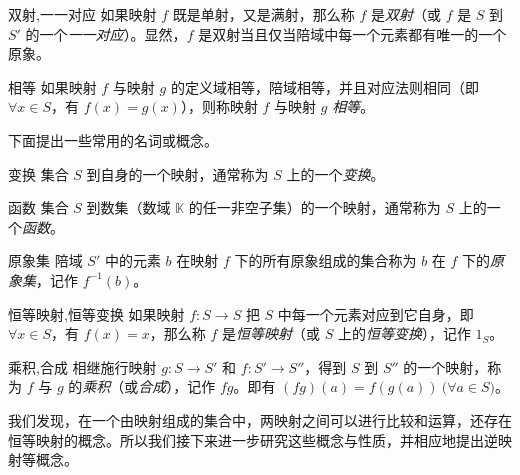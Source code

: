 \begin{definition}{双射,一一对应}
	如果映射 $f$ 既是单射，又是满射，那么称 $f$ 是\emph{双射}（或 $f$ 是 $S$ 到 $S'$ 的一个\emph{一一对应}）。显然，$f$ 是双射当且仅当陪域中每一个元素都有唯一的一个原象。
\end{definition}

\begin{definition}{相等}
	 如果映射 $f$ 与映射 $g$ 的定义域相等，陪域相等，并且对应法则相同（即 $\forall x \in S$，有 $f(x) = g(x)$），则称映射 $f$ 与映射 $g$ \emph{相等}。
\end{definition}

下面提出一些常用的名词或概念。

\begin{definition}{变换}
	集合 $S$ 到自身的一个映射，通常称为 $S$ 上的一个\emph{变换}。
\end{definition}

\begin{definition}{函数}
	集合 $S$ 到数集（数域 $\mathbb K$ 的任一非空子集）的一个映射，通常称为 $S$ 上的一个\emph{函数}。
\end{definition}

\begin{definition}{原象集}
	陪域 $S'$ 中的元素 $b$ 在映射 $f$ 下的所有原象组成的集合称为 $b$ 在 $f$ 下的\emph{原象集}，记作 $f^{-1}(b)$。
\end{definition}

\begin{definition}{恒等映射,恒等变换}
	如果映射 $f \colon S \to S$ 把 $S$ 中每一个元素对应到它自身，即 $\forall x \in S$，有 $f(x) = x$，那么称 $f$ 是\emph{恒等映射}（或 $S$ 上的\emph{恒等变换}），记作 $1_S$。
\end{definition}

\begin{definition}{乘积,合成}
	相继施行映射 $g: S \to S'$ 和 $f \colon S' \to S''$，得到 $S$ 到 $S''$ 的一个映射，称为 $f$ 与 $g$ 的\emph{乘积}（或\emph{合成}），记作 $fg$。即有 $(fg)(a) = f(g(a)) \pod{\forall a \in S}$。
\end{definition}

我们发现，在一个由映射组成的集合中，两映射之间可以进行比较和运算，还存在恒等映射的概念。所以我们接下来进一步研究这些概念与性质，并相应地提出逆映射等概念。